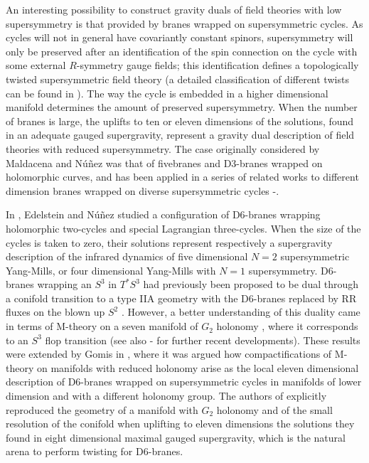 \documentclass[12pt,a4paper]{article}
\begin{document}
\newpage



  
An interesting possibility to construct gravity duals of field theories with low supersymmetry 
is that provided by branes wrapped on supersymmetric cycles. As cycles will not in general 
have covariantly constant spinors, supersymmetry will only be preserved after an 
identification of the spin connection on the cycle with some external $R$-symmetry gauge fields; 
this identification defines a topologically twisted supersymmetric field theory \cite{BSV} 
(a detailed classification of different twists can be found in \cite{BT}). The 
way the cycle is embedded in a higher dimensional manifold determines the amount of 
preserved supersymmetry. When the number of branes is large, the uplifts to ten or eleven 
dimensions of the solutions, found in an adequate gauged supergravity, represent a gravity dual 
description of field theories with reduced supersymmetry. The case originally considered 
by Maldacena and N\'u\~nez \cite{MN1,MN2} was that of fivebranes and D3-branes wrapped 
on holomorphic curves, and has been applied in a series of related works to different 
dimension branes wrapped on diverse supersymmetric cycles \cite{AGK}-\cite{GKPW}. 
  
In \cite{EN}, Edelstein and N\'u\~nez studied a configuration of D6-branes wrapping holomorphic 
two-cycles and special Lagrangian three-cycles. When the size of the cycles is taken to zero, 
their solutions represent respectively a supergravity description of the infrared dynamics 
of five dimensional $N=2$ supersymmetric Yang-Mills, or four dimensional Yang-Mills with 
$N=1$ supersymmetry. D6-branes wrapping an $S^3$ in $T^* S^3$ had previously been proposed 
to be dual through a conifold transition to a type IIA geometry with the D6-branes replaced 
by RR fluxes on the blown up $S^2$ \cite{Vafa}. However, a better understanding of this 
duality came in terms of M-theory on a seven manifold of $G_2$ holonomy \cite{Acharya}, 
where it corresponds to an $S^3$ flop transition \cite{AMV} (see also \cite{Rolling}-\cite{Dasgupta} 
for further recent developments). These results were extended by Gomis in 
\cite{Gomis}, where it was argued how compactifications of M-theory on manifolds with 
reduced holonomy arise as the local eleven dimensional description of D6-branes wrapped 
on supersymmetric cycles in manifolds of lower dimension and with a different holonomy group. 
The authors of \cite{EN} explicitly reproduced the geometry of a manifold with $G_2$ holonomy and 
of the small resolution of the conifold when uplifting to eleven dimensions the solutions they found in 
eight dimensional maximal gauged supergravity, which is the natural arena to perform twisting 
for D6-branes.
  
\end{document}
